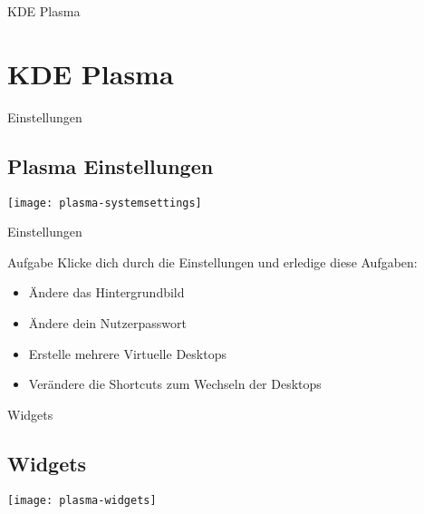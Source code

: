
\begin{frame}{KDE Plasma}
    \section{KDE Plasma}\label{sec:KDE-Plasma}
\end{frame}

\begin{frame}{Einstellungen}
    \subsection{Plasma Einstellungen}\label{subsec:plasma-einstellungen}
    \texttt{[image: plasma-systemsettings]}
\end{frame}

\begin{frame}{Einstellungen}

    \vspace{0.5cm}
    \begin{alertblock}{Aufgabe}
        Klicke dich durch die Einstellungen und erledige diese Aufgaben:

        \pause
        \begin{itemize}
            \item Ändere das Hintergrundbild\pause
            \item Ändere dein Nutzerpasswort\pause
            \item Erstelle mehrere Virtuelle Desktops\pause
            \item Verändere die Shortcuts zum Wechseln der Desktops
        \end{itemize}
    \end{alertblock}
\end{frame}

\begin{frame}{Widgets}
    \subsection{Widgets}\label{subsec:widgets}
    \texttt{[image: plasma-widgets]}
\end{frame}


